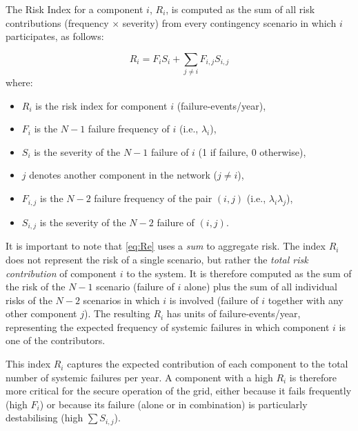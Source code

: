 \documentclass[journal]{IEEEtran}
\begin{document}



The Risk Index for a component $i$, $R_i$, is computed as the sum of all risk contributions (frequency $\times$ severity) from every contingency scenario in which $i$ participates, as follows:

\begin{equation}
R_i = F_i S_i + \sum_{j \neq i} F_{i,j} S_{i,j}
\label{eq:Re}
\end{equation}
where:
\begin{itemize}
    \item $R_i$ is the risk index for component $i$ (failure-events/year),
    \item $F_i$ is the $N-1$ failure frequency of $i$ (i.e., $\lambda_i$),
    \item $S_i$ is the severity of the $N-1$ failure of $i$ (1 if failure, 0 otherwise),
    \item $j$ denotes another component in the network ($j \neq i$),
    \item $F_{i,j}$ is the $N-2$ failure frequency of the pair $(i,j)$ (i.e., $\lambda_i \lambda_j$),
    \item $S_{i,j}$ is the severity of the $N-2$ failure of $(i,j)$.
\end{itemize}

\par
It is important to note that \eqref{eq:Re} 
uses a \textit{sum} to aggregate risk. The index $R_i$ does not represent the risk of a single scenario, but rather the \textit{total risk contribution} of component $i$ to the system. It is therefore computed as the sum of the risk of the $N-1$ scenario (failure of $i$ alone) plus the sum of all individual risks of the $N-2$ scenarios in which $i$ is involved (failure of $i$ together with any other component $j$). The resulting $R_i$ has units of failure-events/year, representing the expected frequency of systemic failures in which component $i$ is one of the contributors.

This index $R_i$ captures the expected contribution of each component to the total number of systemic failures per year. A component with a high $R_i$ is therefore more critical for the secure operation of the grid, either because it fails frequently (high $F_i$) or because its failure (alone or in combination) is particularly destabilising (high $\sum S_{i,j}$).
\end{document}
